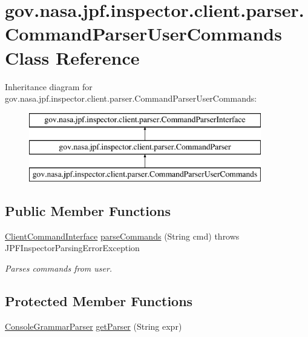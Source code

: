 \hypertarget{classgov_1_1nasa_1_1jpf_1_1inspector_1_1client_1_1parser_1_1_command_parser_user_commands}{}\section{gov.\+nasa.\+jpf.\+inspector.\+client.\+parser.\+Command\+Parser\+User\+Commands Class Reference}
\label{classgov_1_1nasa_1_1jpf_1_1inspector_1_1client_1_1parser_1_1_command_parser_user_commands}
Inheritance diagram for gov.\+nasa.\+jpf.\+inspector.\+client.\+parser.\+Command\+Parser\+User\+Commands\+:\begin{figure}[H]
\begin{center}
\leavevmode
\includegraphics[height=3.000000cm]{classgov_1_1nasa_1_1jpf_1_1inspector_1_1client_1_1parser_1_1_command_parser_user_commands}
\end{center}
\end{figure}
\subsection*{Public Member Functions}
\begin{DoxyCompactItemize}
\item 
\hyperlink{interfacegov_1_1nasa_1_1jpf_1_1inspector_1_1client_1_1_client_command_interface}{Client\+Command\+Interface} \hyperlink{classgov_1_1nasa_1_1jpf_1_1inspector_1_1client_1_1parser_1_1_command_parser_user_commands_a0d5ab51ec113bbfc539c1ded50eccafa}{parse\+Commands} (String cmd)  throws J\+P\+F\+Inspector\+Parsing\+Error\+Exception 
\begin{DoxyCompactList}\small\item\em Parses commands from user. \end{DoxyCompactList}\end{DoxyCompactItemize}
\subsection*{Protected Member Functions}
\begin{DoxyCompactItemize}
\item 
\hyperlink{classgov_1_1nasa_1_1jpf_1_1inspector_1_1client_1_1parser_1_1_console_grammar_parser}{Console\+Grammar\+Parser} \hyperlink{classgov_1_1nasa_1_1jpf_1_1inspector_1_1client_1_1parser_1_1_command_parser_a4f3a71d89c26fff8ef0f3aa1d5c037be}{get\+Parser} (String expr)
\end{DoxyCompactItemize}


